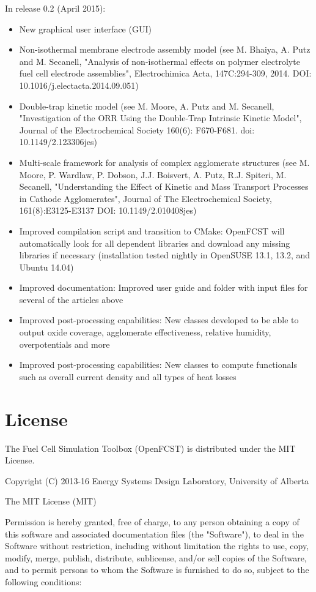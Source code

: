 In release 0.2 (April 2015):
\begin{itemize}
 \item New graphical user interface (GUI)
 \item Non-isothermal membrane electrode assembly model (see M. Bhaiya, A. Putz and M. Secanell, "Analysis of non-isothermal effects on polymer electrolyte fuel cell electrode assemblies", Electrochimica Acta, 147C:294-309, 2014. DOI: 10.1016/j.electacta.2014.09.051)
  \item Double-trap kinetic model (see M. Moore, A. Putz and M. Secanell, "Investigation of the ORR Using the Double-Trap Intrinsic Kinetic Model", Journal of the Electrochemical Society 160(6): F670-F681. doi: 10.1149/2.123306jes)
  \item Multi-scale framework for analysis of complex agglomerate structures (see M. Moore, P. Wardlaw, P. Dobson, J.J. Boisvert, A. Putz, R.J. Spiteri, M. Secanell, "Understanding the Effect of Kinetic and Mass Transport Processes in Cathode Agglomerates", Journal of The Electrochemical Society, 161(8):E3125-E3137 DOI: 10.1149/2.010408jes)
  \item Improved compilation script and transition to CMake: OpenFCST will automatically look for all dependent libraries and download any missing libraries if necessary (installation tested nightly in OpenSUSE 13.1, 13.2, and Ubuntu 14.04)
  \item Improved documentation: Improved user guide and folder with input files for several of the articles above
  \item Improved post-processing capabilities: New classes developed to be able to output oxide coverage, agglomerate effectiveness, relative humidity, overpotentials and more
  \item Improved post-processing capabilities: New classes to compute functionals such as overall current density and all types of heat losses
\end{itemize}


\section{License}

The Fuel Cell Simulation Toolbox (OpenFCST) is distributed under the MIT License.

Copyright (C) 2013-16 Energy Systems Design Laboratory, University of Alberta

The MIT License (MIT)

Permission is hereby granted, free of charge, to any person obtaining a copy of this software 
and associated documentation files (the "Software"), to deal in the Software without restriction, 
including without limitation the rights to use, copy, modify, merge, publish, distribute, 
sublicense, and/or sell copies of the Software, and to permit persons to whom the Software 
is furnished to do so, subject to the following conditions:

